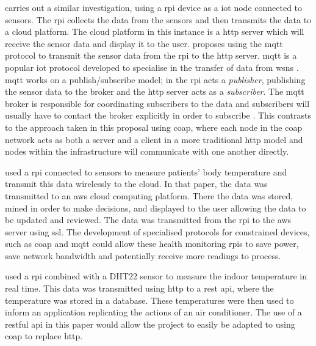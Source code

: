 \cite{rode_iot_2017} carries out a similar investigation, using a \gls{rpi} 
device as a \gls{iot} node connected to sensors. The \gls{rpi} collects the 
data from the sensors and then transmits the data to a cloud platform. The 
cloud platform in this instance is a \gls{http} server which will receive the
sensor data and display it to the user. \cite{rode_iot_2017} proposes using the 
\gls{mqtt} protocol to transmit the sensor data from the \gls{rpi} to the
\gls{http} server.
\gls{mqtt} is a popular \gls{iot} protocol developed to specialise in the transfer
of data from \glspl{wsn} \citep{hunkeler_mqtt-s_2008}. \gls{mqtt} works on a 
publish/subscribe model; in \cite{rode_iot_2017} the \gls{rpi} acts a \textit{publisher}, 
publishing the sensor data to the broker and the \gls{http} server acts as a
\textit{subscriber}. The \gls{mqtt} broker is responsible for coordinating subscribers 
to the data and subscribers will usually have to contact the broker explicitly in 
order to subscribe \citep{hunkeler_mqtt-s_2008}.
This contrasts to the approach taken in this proposal using \gls{coap}, where each
node in the \gls{coap} network acts as both a server and a client in a more traditional
\gls{http} model and nodes within the infrastructure will communicate with one
another directly.

\cite{jassas_smart_2015} used a \gls{rpi} connected to sensors to measure 
patients' body temperature and transmit this data wirelessly to the cloud.
In that paper, the data was transmitted to an \gls{aws} cloud computing platform.
There the data was stored, mined in order to make decisions, 
and displayed to the user allowing the data to be updated and reviewed.
The data was transmitted from the \gls{rpi} to the \gls{aws} server using \gls{ssl}.
The development of specialised protocols for constrained devices, such as \gls{coap}
and \gls{mqtt} could allow these health monitoring \glspl{rpi} to save power,
save network bandwidth and potentially receive more readings to process.

\cite{lee_internet_2018} used a \gls{rpi} combined with a DHT22 sensor to measure
the indoor temperature in real time. This data was transmitted using \gls{http}
to a \gls{rest} \gls{api}, where the temperature was stored in a database.
These temperatures were then used to inform an application replicating 
the actions of an air conditioner. The use of a \gls{rest}ful \gls{api} in 
this paper would allow the project to easily be adapted to using \gls{coap} 
to replace \gls{http}.